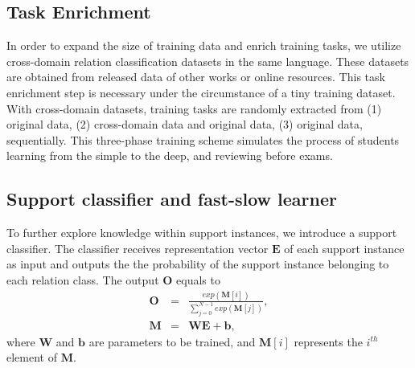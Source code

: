 \subsection{Task Enrichment}
\label{sec:data}
In order to expand the size of training data and enrich training tasks, we utilize cross-domain relation classification datasets in the same language. These datasets are obtained from released data of other works or online resources. This task enrichment step is necessary under the circumstance of a tiny training 
dataset.
With cross-domain datasets, training tasks are randomly extracted from (1) original data, (2) cross-domain data and original data, (3) original data, sequentially.
This three-phase training scheme simulates the process of students learning from the simple to the deep, and reviewing before exams.

\subsection{Support classifier and fast-slow learner}
\label{sec:cls}
To further explore knowledge within support instances, we introduce a support classifier. The classifier receives representation vector $\mathbf{E}$ of each support instance as input and outputs the the probability of the support instance belonging to each relation class. %
The output $\mathbf{O}$ equals to
\begin{eqnarray}
\mathbf{O} &=& \frac{exp(\mathbf{M}[i])}{\sum_{j=0}^{N-1} exp(\mathbf{M}[j])}, \\
\mathbf{M} &=& \mathbf{WE}+ \mathbf{b},
\end{eqnarray}
where $\mathbf{W}$ and $\mathbf{b}$ are parameters to be trained, and $\mathbf{M}[i]$ represents the $i^{th}$ element of $\mathbf{M}$.

